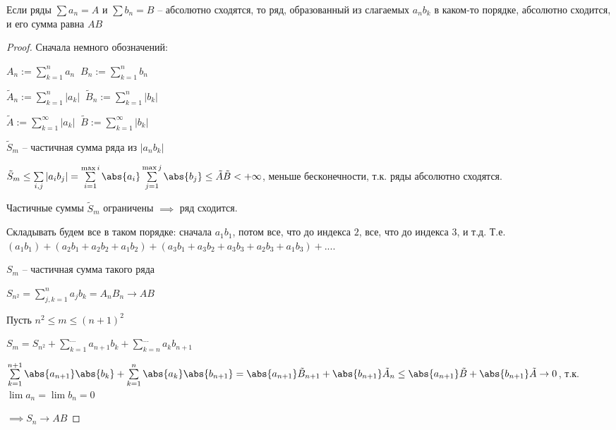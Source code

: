 \begin{theorem}[Коши] \thmslashn
	
	Если ряды $\sum a_n = A$ и $\sum b_n = B$ -- абсолютно сходятся, то ряд, образованный из слагаемых $a_nb_k$ в каком-то порядке, абсолютно сходится, и его сумма равна $AB$
\end{theorem}

\begin{proof} \thmslashn
	
	Сначала немного обозначений:

	$A_n := \sum\limits_{k = 1}^{n} a_n \;\; B_n:= \sum\limits_{k=1}^{n}b_n$
	
	$\tilde{A}_n := \sum\limits_{k = 1}^{n}|a_k| \;\; \tilde{B}_n := \sum\limits_{k=1}^{n}|b_k|$
	
	$\tilde{A} := \sum\limits_{k = 1}^{\infty}|a_k| \;\; \tilde{B} := \sum\limits_{k=1}^{\infty}|b_k|$
	
	
	$\tilde{S}_m$ -- частичная сумма ряда из $|a_nb_k|$
	
	$\tilde{S}_m \le \sum\limits_{i, j} |a_ib_j| = \sum\limits_{i = 1}^{\max{i}}\abs{a_i}\sum\limits_{j = 1}^{\max{j}}\abs{b_j} \le \tilde{A}\tilde{B} < +\infty$, меньше бесконечности, т.к. ряды абсолютно сходятся.
	
	Частичные суммы $\tilde{S}_m$ ограничены $\implies $ ряд сходится.
	
	Складывать будем все в таком порядке: сначала $a_1b_1$, потом все, что до индекса $2$, все, что до индекса $3$, и т.д. Т.е. $(a_1b_1) + (a_2b_1 + a_2b_2 + a_1b_2) + (a_3b_1 + a_3b_2 + a_3b_3 + a_2b_3 + a_1b_3) + ...$.
	
	
	$S_m$ -- частичная сумма такого ряда
	
	$S_{n^2} = \sum\limits_{j,k=1}^{n} a_j b_k = A_n B_n \to AB$
	
	Пусть $n^2 \le m \le (n+1)^2$
	
	$S_m = S_{n^2} + \sum\limits_{k=1}^{...}a_{n+1}b_k + \sum\limits_{k = n}^{...}a_kb_{n+1}$
	
	$\sum\limits_{k=1}^{n+1}\abs{a_{n+1}}\abs{b_k} + \sum\limits_{k=1}^{n}\abs{a_k}\abs{b_{n+1}} = \abs{a_{n+1}}\tilde{B}_{n+1} + \abs{b_{n+1}}\tilde{A}_{n} \le \abs{a_{n+1}}\tilde{B} + \abs{b_{n+1}}\tilde{A} \to 0$, т.к. $\lim a_n = \lim b_n = 0$
	
	$\implies S_n \to AB$
\end{proof}

